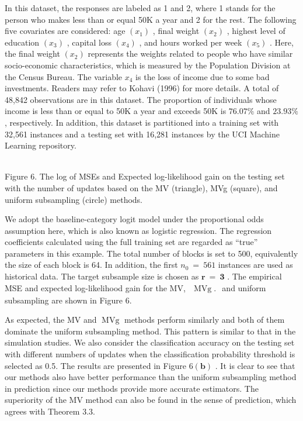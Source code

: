 In this dataset, the responses are labeled as 1 and 2, where 1 stands
for the person who makes less than or equal 50K a year and 2 for the
rest. The following five covariates are considered: age
\(( x _ { 1 } )\) , final weight \(( x _ { 2 } )\) , highest level of
education \(( x _ { 3 } )\) , capital loss \(( x _ { 4 } )\) , and hours
worked per week \(( x _ { 5 } )\) . Here, the final weight
\(( x _ { 2 } )\) represents the weights related to people who have
similar socio-economic characteristics, which is measured by the
Population Division at the Census Bureau. The variable \(x _ { 4 }\) is
the loss of income due to some bad investments. Readers may refer to
Kohavi (1996) for more details. A total of 48,842 observations are in
this dataset. The proportion of individuals whose income is less than or
equal to 50K a year and exceeds 50K is \(7 6 . 0 7 \%\) and
\(2 3 . 9 3 \%\) , respectively. In addition, this dataset is
partitioned into a training set with 32,561 instances and a testing set
with 16,281 instances by the UCI Machine Learning repository.

\\
Figure 6. The log of MSEs and Expected log-likelihood gain on the
testing set with the number of updates based on the MV (triangle), MVg
(square), and uniform subsampling (circle) methods.

We adopt the baseline-category logit model under the proportional odds
assumption here, which is also known as logistic regression. The
regression coefficients calculated using the full training set are
regarded as ``true'' parameters in this example. The total number of
blocks is set to 500, equivalently the size of each block is 64. In
addition, the first \(n _ { 0 } ~ = ~ 5 6 1\) instances are used as
historical data. The target subsample size is chosen as
\(\boldsymbol { r } ~ = ~ \boldsymbol { 3 }\) . The empirical MSE and
expected log-likelihood gain for the MV,
\(\begin{array} { r } { \operatorname { M V g } . } \end{array}\) and
uniform subsampling are shown in Figure 6.

As expected, the MV and \(\operatorname { M V g }\) methods perform
similarly and both of them dominate the uniform subsampling method. This
pattern is similar to that in the simulation studies. We also consider
the classification accuracy on the testing set with different numbers of
updates when the classification probability threshold is selected as
0.5. The results are presented in Figure
\(6 ( \boldsymbol { \mathbf { b } } )\) . It is clear to see that our
methods also have better performance than the uniform subsampling method
in prediction since our methods provide more accurate estimators. The
superiority of the MV method can also be found in the sense of
prediction, which agrees with Theorem 3.3.

